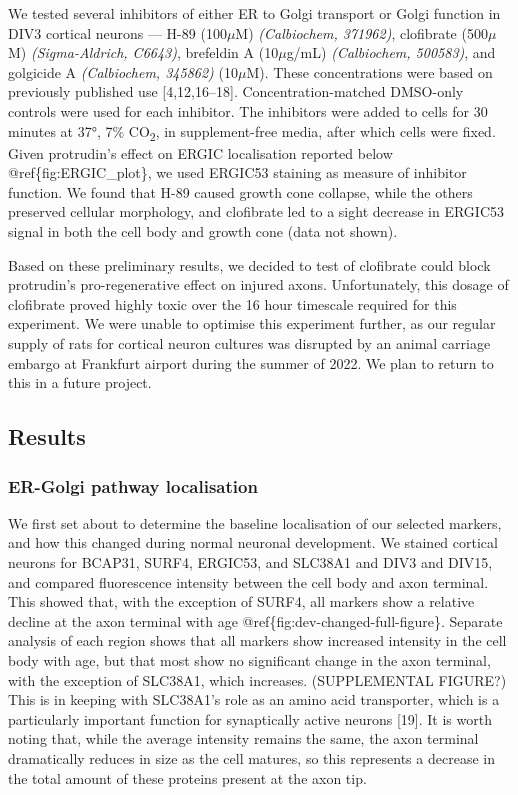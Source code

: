 \documentclass[
  12pt,
  a4paper,
]{article}
\begin{document}
We tested several inhibitors of either ER to Golgi transport or Golgi
function in DIV3 cortical neurons --- H-89 (100\(\mu\)M)
\emph{(Calbiochem, 371962)}, clofibrate (500\(\mu\)M)
\emph{(Sigma-Aldrich, C6643)}, brefeldin A (10\(\mu\)g/mL)
\emph{(Calbiochem, 500583)}, and golgicide A \emph{(Calbiochem, 345862)}
(10\(\mu\)M). These concentrations were based on previously published
use {[}4,12,16--18{]}. Concentration-matched DMSO-only controls were
used for each inhibitor. The inhibitors were added to cells for 30
minutes at 37°, 7\% CO\textsubscript{2}, in supplement-free media, after
which cells were fixed. Given protrudin's effect on ERGIC localisation
reported below @ref\{fig:ERGIC\_plot\}, we used ERGIC53 staining as
measure of inhibitor function. We found that H-89 caused growth cone
collapse, while the others preserved cellular morphology, and clofibrate
led to a sight decrease in ERGIC53 signal in both the cell body and
growth cone (data not shown).

Based on these preliminary results, we decided to test of clofibrate
could block protrudin's pro-regenerative effect on injured axons.
Unfortunately, this dosage of clofibrate proved highly toxic over the 16
hour timescale required for this experiment. We were unable to optimise
this experiment further, as our regular supply of rats for cortical
neuron cultures was disrupted by an animal carriage embargo at Frankfurt
airport during the summer of 2022. We plan to return to this in a future
project.

\hypertarget{results}{%
\subsection{Results}\label{results}}

\hypertarget{er-golgi-pathway-localisation}{%
\subsubsection{ER-Golgi pathway
localisation}\label{er-golgi-pathway-localisation}}

We first set about to determine the baseline localisation of our
selected markers, and how this changed during normal neuronal
development. We stained cortical neurons for BCAP31, SURF4, ERGIC53, and
SLC38A1 and DIV3 and DIV15, and compared fluorescence intensity between
the cell body and axon terminal. This showed that, with the exception of
SURF4, all markers show a relative decline at the axon terminal with age
@ref\{fig:dev-changed-full-figure\}. Separate analysis of each region
shows that all markers show increased intensity in the cell body with
age, but that most show no significant change in the axon terminal, with
the exception of SLC38A1, which increases. (SUPPLEMENTAL FIGURE?) This
is in keeping with SLC38A1's role as an amino acid transporter, which is
a particularly important function for synaptically active neurons
{[}19{]}. It is worth noting that, while the average intensity remains
the same, the axon terminal dramatically reduces in size as the cell
matures, so this represents a decrease in the total amount of these
proteins present at the axon tip.
\end{document}
